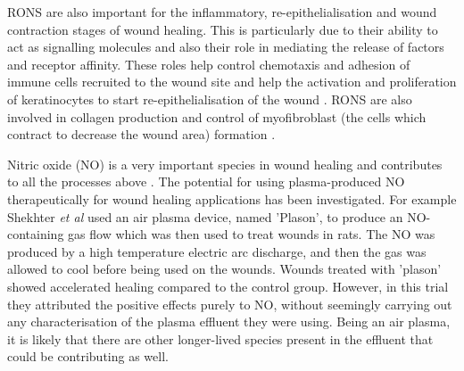 \documentclass[11pt, oneside]{article}   	%
\begin{document}
RONS are also important for the inflammatory, re-epithelialisation and wound contraction stages of wound healing.
This is particularly due to their ability to act as signalling molecules and also their role in mediating the release of factors and receptor affinity.
These roles help control chemotaxis and adhesion of immune cells recruited to the wound site and help the activation and proliferation of keratinocytes to start re-epithelialisation of the wound \cite{Soneja2005role}.
RONS are also involved in collagen production and control of myofibroblast (the cells which contract to decrease the wound area) formation \cite{Soneja2005role}.


Nitric oxide (NO) is a very important species in wound healing and contributes to all the processes above \cite{Soneja2005role}.
The potential for using plasma-produced NO therapeutically for wound healing applications has been investigated.
For example Shekhter \textit{et al} \cite{Shekhter2005beneficial} used an air plasma device, named 'Plason', to produce an NO-containing gas flow which was then used to treat wounds in rats. 
The NO was produced by a high temperature electric arc discharge, and then the gas was allowed to cool before being used on the wounds. 
Wounds treated with 'plason' showed accelerated healing compared to the control group.
However, in this trial they attributed the positive effects purely to NO, without seemingly carrying out any characterisation of the plasma effluent they were using.
Being an air plasma, it is likely that there are other longer-lived species present in the effluent that could be contributing as well.

%
%
\end{document}
